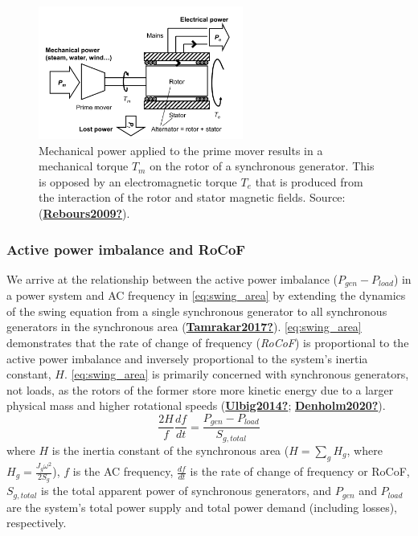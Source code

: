 \documentclass[12pt,a4paper,]{report}
\begin{document}
\begin{figure}
\hypertarget{fig:synch_torques}{%
\centering
\includegraphics[width=0.6\textwidth,height=\textheight]{source/figures/swing.png}
\caption{Mechanical power applied to the prime mover results in a
mechanical torque \(T_m\) on the rotor of a synchronous generator. This
is opposed by an electromagnetic torque \(T_e\) that is produced from
the interaction of the rotor and stator magnetic fields. Source:
(\protect\hyperlink{ref-Rebours2009}{\textbf{Rebours2009?}}).}\label{fig:synch_torques}
}
\end{figure}

\hypertarget{active-power-imbalance-and-rocof}{%
\subsubsection{Active power imbalance and
RoCoF}\label{active-power-imbalance-and-rocof}}

We arrive at the relationship between the active power imbalance
(\(P_{gen}-P_{load}\)) in a power system and AC frequency in
\protect\hyperlink{eq:swing_area}{{[}eq:swing\_area{]}} by extending the
dynamics of the swing equation from a single synchronous generator to
all synchronous generators in the synchronous area
(\protect\hyperlink{ref-Tamrakar2017}{\textbf{Tamrakar2017?}}).
\protect\hyperlink{eq:swing_area}{{[}eq:swing\_area{]}} demonstrates
that the rate of change of frequency (\emph{RoCoF}) is proportional to
the active power imbalance and inversely proportional to the system's
inertia constant, \(H\).
\protect\hyperlink{eq:swing_area}{{[}eq:swing\_area{]}} is primarily
concerned with synchronous generators, not loads, as the rotors of the
former store more kinetic energy due to a larger physical mass and
higher rotational speeds
(\protect\hyperlink{ref-Ulbig2014}{\textbf{Ulbig2014?}};
\protect\hyperlink{ref-Denholm2020}{\textbf{Denholm2020?}}).
\[\frac{2H}{f}\frac{df}{dt} = \frac{P_{gen}-P_{load}}{S_{g, total}}
        \label{eq:swing_area}\] where \(H\) is the inertia constant of
the synchronous area (\(H=\sum_{g} H_g\), where
\(H_g = \frac{J_g \omega^2}{2S_g}\)), \(f\) is the AC frequency,
\(\frac{df}{dt}\) is the rate of change of frequency or RoCoF,
\(S_{g,total}\) is the total apparent power of synchronous generators,
and \(P_{gen}\) and \(P_{load}\) are the system's total power supply and
total power demand (including losses), respectively.
\end{document}
